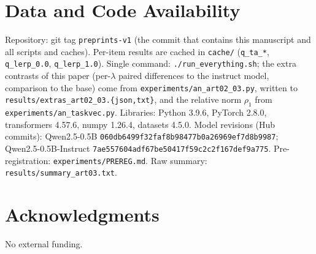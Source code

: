 \documentclass[conference]{IEEEtran}
\begin{document}
\section*{Data and Code Availability}
\sloppy
Repository: git tag \texttt{preprints-v1} (the commit that contains this manuscript and all scripts and caches). Per-item results are cached in \texttt{cache/} (\texttt{q\_ta\_*}, \texttt{q\_lerp\_0.0}, \texttt{q\_lerp\_1.0}). Single command: \texttt{./run\_everything.sh}; the extra contrasts of this paper (per-$\lambda$ paired differences to the instruct model, comparison to the base) come from \texttt{experiments/\allowbreak an\_art02\_03.py}, written to \texttt{results/extras\_art02\_03.\{json,txt\}}, and the relative norm $\rho_1$ from \texttt{experiments/\allowbreak an\_taskvec.py}. Libraries: Python 3.9.6, PyTorch 2.8.0, transformers 4.57.6, numpy 1.26.4, datasets 4.5.0. Model revisions (Hub commits): Qwen2.5-0.5B \texttt{060db6499f32faf8\allowbreak b98477b0a26969ef7d8b9987}; Qwen2.5-0.5B-Instruct \texttt{7ae557604adf67be\allowbreak 50417f59c2c2f167def9a775}. Pre-registration: \texttt{experiments/PREREG.md}. Raw summary: \texttt{results/summary\_art03.txt}.

\section*{Acknowledgments}
No external funding.
\end{document}
